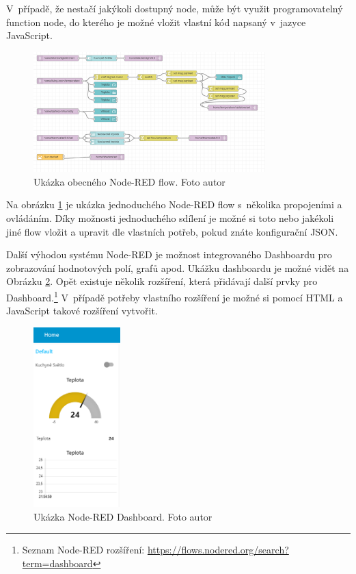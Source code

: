 V~případě, že nestačí jakýkoli dostupný node, může být využit programovatelný function node, do kterého je možné vložit vlastní kód napsaný v~jazyce JavaScript.

\begin{figure}[H]
  \centering
  \includegraphics[width=0.8\textwidth]{obrazky-figures/softwareComponents/nodeREDExample.png}
  \caption{Ukázka obecného Node-RED flow. Foto autor}
  \label{nodeRedExample}
\end{figure}

Na obrázku \ref{nodeRedExample} je ukázka jednoduchého Node-RED flow s~několika propojeními a ovládáním. Díky možnosti jednoduchého sdílení je možné si toto nebo jakékoli jiné flow vložit a upravit dle vlastních potřeb, pokud znáte konfigurační JSON.

Další výhodou systému Node-RED je možnost integrovaného Dashboardu pro zobrazování hodnotových polí, grafů apod. Ukážku dashboardu je možné vidět na Obrázku \ref{nodeRedDashboardExample}. Opět existuje několik rozšíření, která přidávají další prvky pro Dashboard.\footnote{Seznam Node-RED rozšíření: \url{https://flows.nodered.org/search?term=dashboard}} V~případě potřeby vlastního rozšíření je možné si pomocí HTML a JavaScript takové rozšíření vytvořit. 

\begin{figure}[H]
  \centering
  \includegraphics[width=0.3\textwidth]{obrazky-figures/softwareComponents/nodeRedDashboard.png}
  \caption{Ukázka Node-RED Dashboard. Foto autor}
  \label{nodeRedDashboardExample}
\end{figure}

